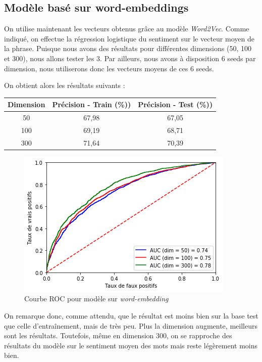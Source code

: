 \documentclass[11pt,french,french]{article}
\begin{document}
\subsection{\texorpdfstring{Modèle basé sur
\textbf{word-embeddings}}{Modèle basé sur word-embeddings}}\label{moduxe8le-basuxe9-sur-word-embeddings}

On utilise maintenant les vecteurs obtenus grâce au modèle
\emph{Word2Vec}. Comme indiqué, on effectue la régression logistique du
sentiment sur le vecteur moyen de la phrase. Puisque nous avons des
résultats pour différentes dimensions (50, 100 et 300), nous allons
tester les 3. Par ailleurs, nous avons à disposition 6 seeds par
dimension, nous utiliserons donc les vecteurs moyens de ces 6 seeds.

On obtient alors les résultats suivants :

\begin{center}
\begin{tabular}{| c || c | c |}
\hline
Dimension & Précision - Train (\%)) & Précision - Test (\%)) \\ \hline
50 & 67,98 & 67,05 \\ \hline
100 & 69,19 & 68,71 \\ \hline
300 & 71,64 & 70,39 \\ \hline
\end{tabular}
\end{center}

\begin{figure}
\centering
\includegraphics{img/roc_word.png}
\caption{Courbe ROC pour modèle sur \emph{word-embedding}}
\end{figure}

On remarque donc, comme attendu, que le résultat est moins bien sur la
base test que celle d'entraînement, mais de très peu. Plus la dimension
augmente, meilleurs sont les résultats. Toutefois, même en dimension
300, on se rapproche des résultats du modèle sur le sentiment moyen des
mots mais reste légèrement moins bien.
\end{document}
